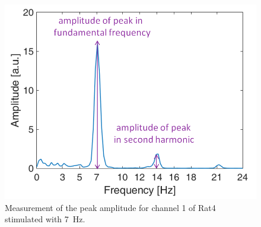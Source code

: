 \documentclass{pracalicmgr}
\begin{document}
   \begin{figure}[H]
   	\centering
   	\includegraphics[scale=0.5]{pik_widmo2.png}
   	\caption{Measurement of the peak amplitude for channel 1 of Rat4 stimulated with 7~Hz.}
   	\label{rys:pik_widmo}
   \end{figure}
   
   
\end{document}
